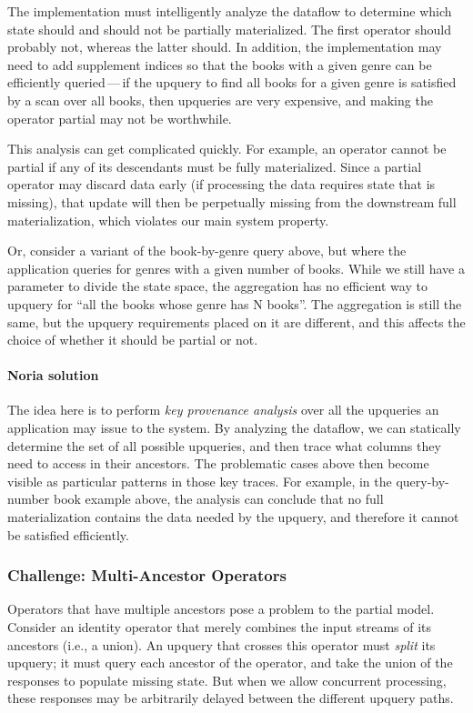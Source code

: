 \documentclass[12pt,letterpaper,twoside]{article}
\begin{document}
The implementation must intelligently analyze the dataflow to determine
which state should and should not be partially materialized. The first
operator should probably not, whereas the latter should. In addition,
the implementation may need to add supplement indices so that the books
with a given genre can be efficiently queried\,---\,if the upquery to find
all books for a given genre is satisfied by a scan over all books, then
upqueries are very expensive, and making the operator partial may not be
worthwhile.

This analysis can get complicated quickly. For example, an operator
cannot be partial if any of its descendants must be fully materialized.
Since a partial operator may discard data early (if processing the data
requires state that is missing), that update will then be perpetually
missing from the downstream full materialization, which violates our
main system property.

Or, consider a variant of the book-by-genre query above, but where the
application queries for genres with a given number of books. While we
still have a parameter to divide the state space, the aggregation has no
efficient way to upquery for ``all the books whose genre has N books''.
The aggregation is still the same, but the upquery requirements placed
on it are different, and this affects the choice of whether it should be
partial or not.

\paragraph{Noria solution}
The idea here is to perform \emph{key provenance analysis} over all the
upqueries an application may issue to the system. By analyzing the dataflow, we
can statically determine the set of all possible upqueries, and then trace what
columns they need to access in their ancestors. The problematic cases above then
become visible as particular patterns in those key traces. For example, in the
query-by-number book example above, the analysis can conclude that no full
materialization contains the data needed by the upquery, and therefore it cannot
be satisfied efficiently.

\subsubsection{Challenge: Multi-Ancestor Operators}

Operators that have multiple ancestors pose a problem to the partial
model. Consider an identity operator that merely combines the input
streams of its ancestors (i.e., a union). An upquery that crosses this
operator must \emph{split} its upquery; it must query each ancestor of the
operator, and take the union of the responses to populate missing state.
But when we allow concurrent processing, these responses may be
arbitrarily delayed between the different upquery paths.
\end{document}

